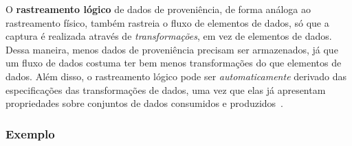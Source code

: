O \textbf{rastreamento lógico} de dados de proveniência, de forma análoga ao rastreamento físico, também rastreia o fluxo de elementos de dados, só que a captura é realizada através de \emph{transformações}, em vez de elementos de dados. Dessa maneira, menos dados de proveniência precisam ser armazenados, já que um fluxo de dados costuma ter bem menos transformações do que elementos de dados. Além disso, o rastreamento lógico pode ser \emph{automaticamente} derivado das especificações das transformações de dados, uma vez que elas já apresentam propriedades sobre conjuntos de dados consumidos e produzidos~\cite{ikeda2013logical}.


\subsubsection{Exemplo}


